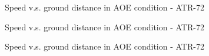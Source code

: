 %
%
%
%
%
%
%
%
%

\begin{figure}

\caption{Speed v.s. ground distance in AOE condition - ATR-72}
\end{figure}
%
\begin{figure}

\caption{Speed v.s. ground distance in AOE condition - ATR-72}
\end{figure}
%
\begin{figure}

\caption{Speed v.s. ground distance in AOE condition - ATR-72}
\end{figure}


